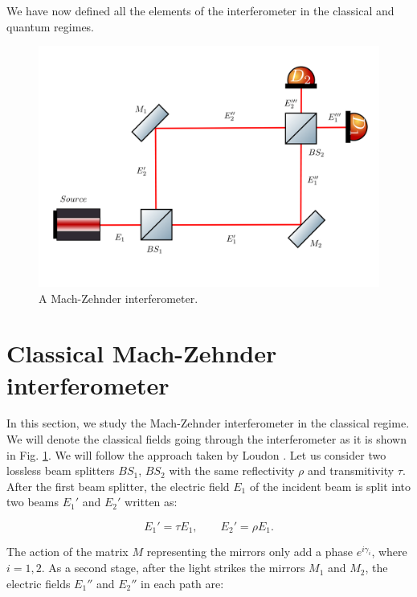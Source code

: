 \documentclass[12pt]{book}
\begin{document}
 We have now defined all the elements of the interferometer in the classical and quantum regimes.

\begin{figure}[H]
\centering
\includegraphics[width=\linewidth]{images/machzenhdercla.png}
\caption{A Mach-Zehnder interferometer.}
\label{fig:classical mach}
\end{figure}



\section{Classical Mach-Zehnder interferometer}

In this section, we study the Mach-Zehnder interferometer in the classical regime. We will denote the classical fields going through the interferometer as it is shown in Fig. \ref{fig:classical mach}. We will follow the approach taken by Loudon \cite{ludon}. Let us consider two lossless beam splitters   $BS_{1}$, $BS_{2}$ with the same reflectivity $\rho$ and transmitivity $\tau$. After the first beam splitter, the electric field $E_{1}$ of the incident beam is split into two beams $E_{1}'$ and $E_{2}'$ written as:

\begin{equation}
E_{1}'=\tau E_{1} ,\qquad E_{2}'=\rho E_{1}.\label{corr1}
\end{equation}

The action of the matrix $M$ representing the mirrors only add a phase $e^{i\gamma_{i}}$, where $i=1,2$. As a second stage, after the light strikes the mirrors $M_{1}$ and $M_{2}$, the electric fields $E_{1}''$ and $E_{2}''$ in each path are:
\end{document}
